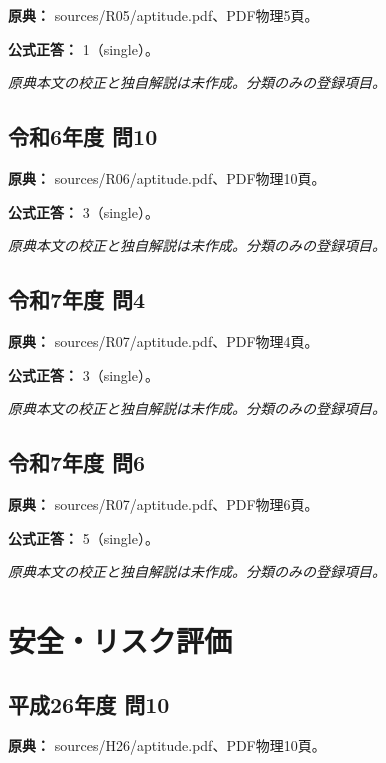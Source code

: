 \noindent\textbf{原典：} sources/R05/aptitude.pdf、PDF物理5頁。

\textbf{公式正答：} 1（single）。

\par\textit{原典本文の校正と独自解説は未作成。分類のみの登録項目。}

\subsection{令和6年度 問10}
\label{q:r06-reg-apt-10}

\noindent\textbf{原典：} sources/R06/aptitude.pdf、PDF物理10頁。

\textbf{公式正答：} 3（single）。

\par\textit{原典本文の校正と独自解説は未作成。分類のみの登録項目。}

\subsection{令和7年度 問4}
\label{q:r07-reg-apt-04}

\noindent\textbf{原典：} sources/R07/aptitude.pdf、PDF物理4頁。

\textbf{公式正答：} 3（single）。

\par\textit{原典本文の校正と独自解説は未作成。分類のみの登録項目。}

\subsection{令和7年度 問6}
\label{q:r07-reg-apt-06}

\noindent\textbf{原典：} sources/R07/aptitude.pdf、PDF物理6頁。

\textbf{公式正答：} 5（single）。

\par\textit{原典本文の校正と独自解説は未作成。分類のみの登録項目。}

\section{安全・リスク評価}

\subsection{平成26年度 問10}
\label{q:h26-reg-apt-10}

\noindent\textbf{原典：} sources/H26/aptitude.pdf、PDF物理10頁。

